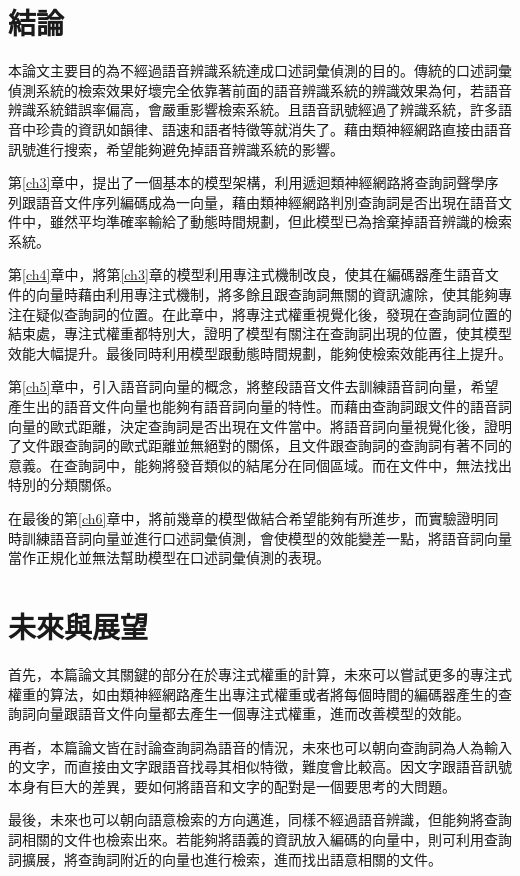 \section{結論}
本論文主要目的為不經過語音辨識系統達成口述詞彙偵測的目的。傳統的口述詞彙偵測系統的檢索效果好壞完全依靠著前面的語音辨識系統的辨識效果為何，若語音辨識系統錯誤率偏高，會嚴重影響檢索系統。且語音訊號經過了辨識系統，許多語音中珍貴的資訊如韻律、語速和語者特徵等就消失了。藉由類神經網路直接由語音訊號進行搜索，希望能夠避免掉語音辨識系統的影響。

第\ref{ch3}章中，提出了一個基本的模型架構，利用遞迴類神經網路將查詢詞聲學序列跟語音文件序列編碼成為一向量，藉由類神經網路判別查詢詞是否出現在語音文件中，雖然平均準確率輸給了動態時間規劃，但此模型已為捨棄掉語音辨識的檢索系統。

第\ref{ch4}章中，將第\ref{ch3}章的模型利用專注式機制改良，使其在編碼器產生語音文件的向量時藉由利用專注式機制，將多餘且跟查詢詞無關的資訊濾除，使其能夠專注在疑似查詢詞的位置。在此章中，將專注式權重視覺化後，發現在查詢詞位置的結束處，專注式權重都特別大，證明了模型有關注在查詢詞出現的位置，使其模型效能大幅提升。最後同時利用模型跟動態時間規劃，能夠使檢索效能再往上提升。

第\ref{ch5}章中，引入語音詞向量的概念，將整段語音文件去訓練語音詞向量，希望產生出的語音文件向量也能夠有語音詞向量的特性。而藉由查詢詞跟文件的語音詞向量的歐式距離，決定查詢詞是否出現在文件當中。將語音詞向量視覺化後，證明了文件跟查詢詞的歐式距離並無絕對的關係，且文件跟查詢詞的查詢詞有著不同的意義。在查詢詞中，能夠將發音類似的結尾分在同個區域。而在文件中，無法找出特別的分類關係。

在最後的第\ref{ch6}章中，將前幾章的模型做結合希望能夠有所進步，而實驗證明同時訓練語音詞向量並進行口述詞彙偵測，會使模型的效能變差一點，將語音詞向量當作正規化並無法幫助模型在口述詞彙偵測的表現。
\section{未來與展望}
首先，本篇論文其關鍵的部分在於專注式權重的計算，未來可以嘗試更多的專注式權重的算法，如由類神經網路產生出專注式權重或者將每個時間的編碼器產生的查詢詞向量跟語音文件向量都去產生一個專注式權重，進而改善模型的效能。

再者，本篇論文皆在討論查詢詞為語音的情況，未來也可以朝向查詢詞為人為輸入的文字，而直接由文字跟語音找尋其相似特徵，難度會比較高。因文字跟語音訊號本身有巨大的差異，要如何將語音和文字的配對是一個要思考的大問題。

最後，未來也可以朝向語意檢索的方向邁進，同樣不經過語音辨識，但能夠將查詢詞相關的文件也檢索出來。若能夠將語義的資訊放入編碼的向量中，則可利用查詢詞擴展，將查詢詞附近的向量也進行檢索，進而找出語意相關的文件。
